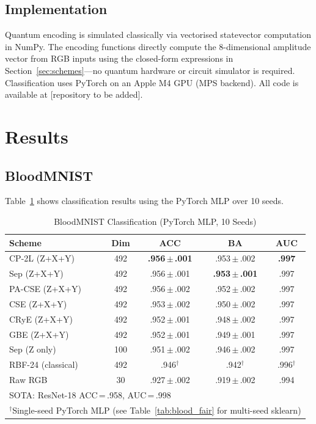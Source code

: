 \documentclass[conference,compsoc]{IEEEtran}
\begin{document}
\subsection{Implementation}

Quantum encoding is simulated classically via vectorised statevector computation in NumPy.
The encoding functions directly compute the 8-dimensional amplitude vector from RGB inputs using the closed-form expressions in Section~\ref{sec:schemes}---no quantum hardware or circuit simulator is required.
Classification uses PyTorch on an Apple M4 GPU (MPS backend).
All code is available at [repository to be added].

\section{Results}
\label{sec:results}

\subsection{BloodMNIST}
\label{sec:results_blood}

Table~\ref{tab:blood_mlp} shows classification results using the PyTorch MLP over 10 seeds.

\begin{table}[t]
\renewcommand{\arraystretch}{1.15}
\caption{BloodMNIST Classification (PyTorch MLP, 10 Seeds)}
\label{tab:blood_mlp}
\centering
\begin{tabular}{lcccc}
\toprule
Scheme & Dim & ACC & BA & AUC \\
\midrule
CP-2L (Z+X+Y) & 492 & \textbf{.956\,$\pm$\,.001} & .953\,$\pm$\,.002 & \textbf{.997} \\
Sep (Z+X+Y) & 492 & .956\,$\pm$\,.001 & \textbf{.953\,$\pm$\,.001} & .997 \\
PA-CSE (Z+X+Y) & 492 & .956\,$\pm$\,.002 & .952\,$\pm$\,.002 & .997 \\
CSE (Z+X+Y) & 492 & .953\,$\pm$\,.002 & .950\,$\pm$\,.002 & .997 \\
CRyE (Z+X+Y) & 492 & .952\,$\pm$\,.001 & .948\,$\pm$\,.002 & .997 \\
GBE (Z+X+Y) & 492 & .952\,$\pm$\,.001 & .949\,$\pm$\,.001 & .997 \\
Sep (Z only) & 100 & .951\,$\pm$\,.002 & .946\,$\pm$\,.002 & .997 \\
\midrule
RBF-24 (classical) & 492 & .946$^\dagger$ & .942$^\dagger$ & .996$^\dagger$ \\
Raw RGB & 30 & .927\,$\pm$\,.002 & .919\,$\pm$\,.002 & .994 \\
\midrule
\multicolumn{5}{l}{\footnotesize SOTA: ResNet-18 ACC\,=\,.958, AUC\,=\,.998~\cite{yang2023medmnist}} \\
\multicolumn{5}{l}{\footnotesize $^\dagger$Single-seed PyTorch MLP (see Table~\ref{tab:blood_fair} for multi-seed sklearn)}
\end{tabular}
\end{table}
\end{document}
